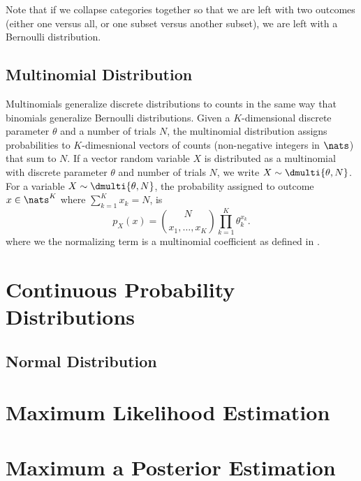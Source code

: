 Note that if we collapse categories together so that we
are left with two outcomes (either one versus all, or
one subset versus another subset), we are left with
a Bernoulli distribution.


\subsection{Multinomial Distribution}\label{section:stats-multinom-distro}

Multinomials generalize discrete distributions to counts in the same
way that binomials generalize Bernoulli distributions.  Given a
$K$-dimensional discrete parameter $\theta$ and a number of trials
$N$, the multinomial distribution assigns probabilities to
$K$-dimesnional vectors of counts (non-negative integers in $\nats$)
that sum to $N$.  If a vector random variable $X$ is distributed as a
multinomial with discrete parameter $\theta$ and number of trials $N$,
we write $X \sim \dmulti{\theta,N}$.  For a variable $X \sim
\dmulti{\theta,N}$, the probability assigned to outcome $x \in
\nats^K$ where $\sum_{k=1}^K x_k = N$, is
%
\begin{equation}
p_X(x) = {N \choose {x_1,\ldots,x_K}} \prod_{k=1}^K \theta_k^{x_k}.
\end{equation}
%
where we the normalizing term is a multinomial coefficient as defined
in .






\section{Continuous Probability Distributions}

\subsection{Normal Distribution}\label{section:stats-normal-distribution}


\section{Maximum Likelihood Estimation}\label{section:stats-mle}

\section{Maximum a Posterior Estimation}\label{section:stats-map}


